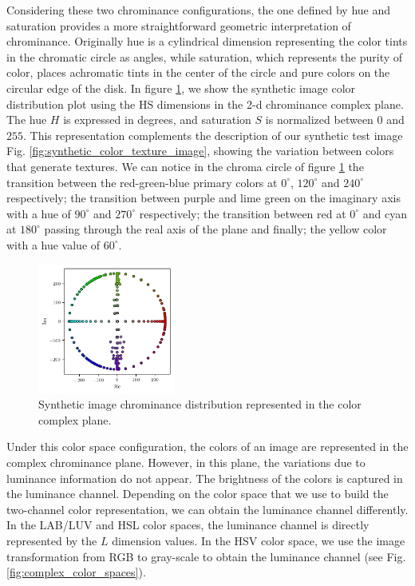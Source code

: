 \documentclass[journal]{IEEEtran}
\begin{document}
Considering these two chrominance configurations, the one defined by hue and saturation provides a more straightforward geometric interpretation of chrominance. Originally hue is a cylindrical dimension representing the color tints in the chromatic circle as angles, while saturation, which represents the purity of color, places achromatic tints in the center of the circle and pure colors on the circular edge of the disk. In figure \ref{fig:color_complex_plane}, we show the synthetic image color distribution plot using the HS dimensions in the 2-d chrominance complex plane. The hue $H$ is expressed in degrees, and saturation $S$ is normalized between $0$ and $255$. This representation complements the description of our synthetic test image Fig. \ref{fig:synthetic_color_texture_image}, showing the variation between colors that generate textures. We can notice in the chroma circle of figure \ref{fig:color_complex_plane} the transition between the red-green-blue primary colors at $0^\circ$, $120^\circ$ and $240^\circ$ respectively; the transition between purple and lime green on the imaginary axis with a hue of $90^\circ$ and $270^\circ$ respectively; the transition between red at $0^\circ$ and cyan at $180^\circ$ passing through the real axis of the plane and finally; the yellow color with a hue value of $60^\circ$.

\begin{figure}[!ht]
	\centering
    \includegraphics[width=0.4\textwidth]{color_complex_plane}
	\caption{Synthetic image chrominance distribution represented in the color complex plane.}\label{fig:color_complex_plane}
\end{figure}

Under this color space configuration, the colors of an image are represented in the complex chrominance plane. However, in this plane, the variations due to luminance information do not appear. The brightness of the colors is captured in the luminance channel. Depending on the color space that we use to build the two-channel color representation, we can obtain the luminance channel differently. In the LAB/LUV and HSL color spaces, the luminance channel is directly represented by the $L$ dimension values. In the HSV color space, we use the image transformation from RGB to gray-scale to obtain the luminance channel (see Fig. \ref{fig:complex_color_spaces}).
\end{document}
